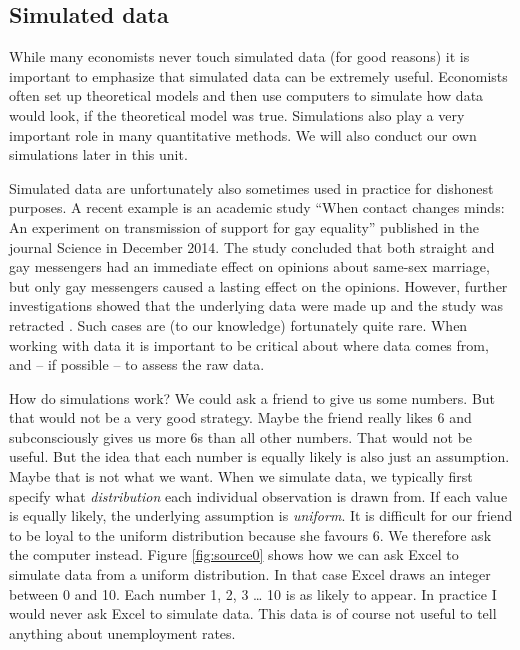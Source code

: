 \documentclass[
]{book}
\begin{document}
\hypertarget{simulated-data}{%
\subsection*{Simulated data}\label{simulated-data}}

While many economists never touch simulated data (for good reasons) it is important to emphasize that simulated data can be extremely useful. Economists often set up theoretical models and then use computers to simulate how data would look, if the theoretical model was true. Simulations also play a very important role in many quantitative methods. We will also conduct our own simulations later in this unit.

Simulated data are unfortunately also sometimes used in practice for dishonest purposes. A recent example is an academic study ``When contact changes minds: An experiment on transmission of support for gay equality'' \citep{lacour2014contact} published in the journal Science in December 2014. The study concluded that both straight and gay messengers had an immediate effect on opinions about same-sex marriage, but only gay messengers caused a lasting effect on the opinions. However, further investigations showed that the underlying data were made up and the study was retracted \citep{lacour} . Such cases are (to our knowledge) fortunately quite rare. When working with data it is important to be critical about where data comes from, and -- if possible -- to assess the raw data.

How do simulations work? We could ask a friend to give us some numbers. But that would not be a very good strategy. Maybe the friend really likes 6 and subconsciously gives us more 6s than all other numbers. That would not be useful. But the idea that each number is equally likely is also just an assumption. Maybe that is not what we want. When we simulate data, we typically first specify what \emph{distribution} each individual observation is drawn from. If each value is equally likely, the underlying assumption is \emph{uniform}. It is difficult for our friend to be loyal to the uniform distribution because she favours 6. We therefore ask the computer instead. Figure \ref{fig:source0} shows how we can ask Excel to simulate data from a uniform distribution. In that case Excel draws an integer between 0 and 10. Each number 1, 2, 3 \ldots{} 10 is as likely to appear. In practice I would never ask Excel to simulate data. This data is of course not useful to tell anything about unemployment rates.
\end{document}
